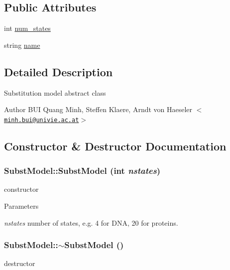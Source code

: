 \subsection*{Public Attributes}
\begin{DoxyCompactItemize}
\item 
int \hyperlink{classSubstModel_abc3ccd407830f359e794ac3fd51a5559}{num\_\-states}
\item 
string \hyperlink{classSubstModel_a28fd43ca59508025c8faa9365861a3d8}{name}
\end{DoxyCompactItemize}


\subsection{Detailed Description}
Substitution model abstract class

\begin{DoxyAuthor}{Author}
BUI Quang Minh, Steffen Klaere, Arndt von Haeseler $<$\href{mailto:minh.bui@univie.ac.at}{\tt minh.bui@univie.ac.at}$>$ 
\end{DoxyAuthor}


\subsection{Constructor \& Destructor Documentation}
\hypertarget{classSubstModel_ad9629506c448db08c094f65569795242}{
\subsubsection[{SubstModel}]{\setlength{\rightskip}{0pt plus 5cm}SubstModel::SubstModel (int {\em nstates})}}
\label{classSubstModel_ad9629506c448db08c094f65569795242}
constructor 
\begin{DoxyParams}{Parameters}
\item[{\em nstates}]number of states, e.g. 4 for DNA, 20 for proteins. \end{DoxyParams}
\hypertarget{classSubstModel_accfa9c36ec87262ca1479fcdb4c95c3d}{
\subsubsection[{$\sim$SubstModel}]{\setlength{\rightskip}{0pt plus 5cm}SubstModel::$\sim$SubstModel ()}}
\label{classSubstModel_accfa9c36ec87262ca1479fcdb4c95c3d}
destructor 

